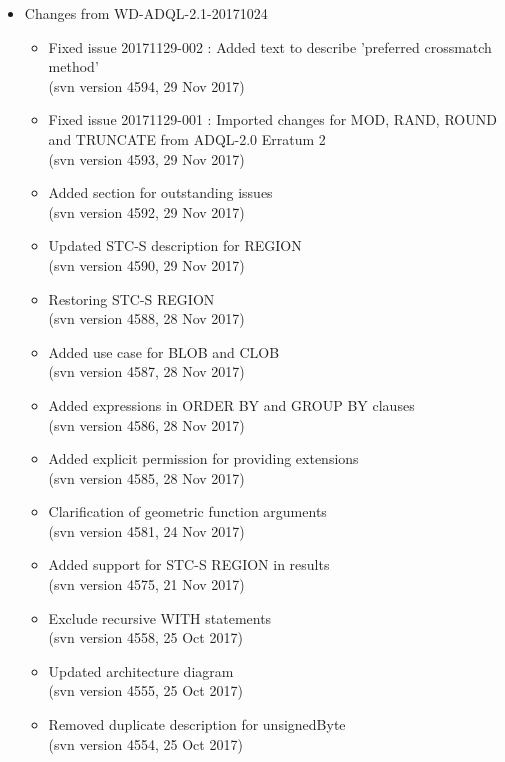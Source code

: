 \documentclass[11pt,a4paper]{ivoa}
\begin{document}
\begin{itemize}
    \item Changes from WD-ADQL-2.1-20171024
        \begin{itemize}
            \item Fixed issue 20171129-002 : Added text to describe 'preferred crossmatch method'\\
            (svn version 4594, 29 Nov 2017)
            \item Fixed issue 20171129-001 : Imported changes for MOD, RAND, ROUND and TRUNCATE from ADQL-2.0 Erratum 2\\
            (svn version 4593, 29 Nov 2017)
            \item Added section for outstanding issues\\
            (svn version 4592, 29 Nov 2017)
            \item Updated STC-S description for REGION\\
            (svn version 4590, 29 Nov 2017)
            \item Restoring STC-S REGION\\
            (svn version 4588, 28 Nov 2017)
            \item Added use case for BLOB and CLOB\\
            (svn version 4587, 28 Nov 2017)
            \item Added expressions in ORDER BY and GROUP BY clauses\\
            (svn version 4586, 28 Nov 2017)
            \item Added explicit permission for providing extensions\\
            (svn version 4585, 28 Nov 2017)
            \item Clarification of geometric function arguments\\
            (svn version 4581, 24 Nov 2017)
            \item Added support for STC-S REGION in results\\
            (svn version 4575, 21 Nov 2017)
            \item Exclude recursive WITH statements\\
            (svn version 4558, 25 Oct 2017)
            \item Updated architecture diagram\\
            (svn version 4555, 25 Oct 2017)
            \item Removed duplicate description for unsignedByte\\
            (svn version 4554, 25 Oct 2017)
        \end{itemize}


\end{itemize}
\end{document}
